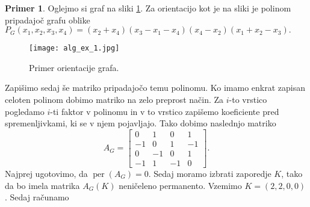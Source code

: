 \documentclass[12pt,a4paper,twoside]{article}
\theoremstyle{definition} %
\newtheorem{primer}[definicija]{Primer}
\theoremstyle{plain} %
\numberwithin{equation}{section}  %
\DeclareMathOperator{\per}{per}
\begin{document}
\begin{primer}

Oglejmo si graf na sliki \ref{ex_1}. Za orientacijo kot je na sliki je polinom pripadajoč grafu oblike $P_G(x_1, x_2, x_3, x_4) =(x_2 + x_4)(x_3 - x_1 - x_4)(x_4 - x_2)(x_1 + x_2 - x_3). $
 \begin{figure}[h!]
\caption{Primer orientacije grafa.}
\label{ex_1}
\centering
    \texttt{[image: alg\_ex\_1.jpg]}
    \end{figure}
Zapišimo sedaj še matriko pripadajočo temu polinomu. Ko imamo enkrat zapisan celoten polinom dobimo matriko na zelo preprost način. Za $i$-to vrstico pogledamo $i$-ti faktor v polinomu in v to vrstico zapišemo koeficiente pred spremenljivkami, ki se v njem pojavljajo. Tako dobimo naslednjo matriko 
$$ A_G = \left[ \begin{matrix} 0 & 1 & 0 & 1 \\ -1 & 0 & 1 & -1 \\ 0 & -1 & 0 & 1 \\ -1 & 1 & -1 & 0 \end{matrix} \right] .$$
 Najprej ugotovimo, da $\per(A_G) = 0$. Sedaj moramo izbrati zaporedje $K$, tako da bo imela matrika $A_G(K)$ neničeleno permanento. Vzemimo $K = (2,2,0,0)$. Sedaj računamo 


\end{primer}
\end{document}
